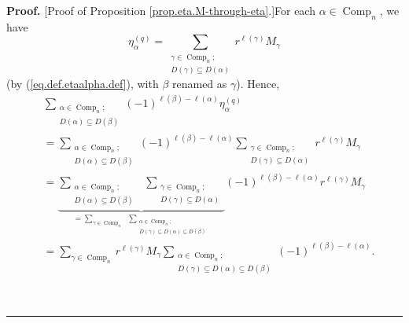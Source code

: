 \documentclass[numbers=enddot,12pt,final,onecolumn,notitlepage]{scrartcl}%
\theoremstyle{definition}
\newenvironment{proof}[1][Proof]{\noindent\textbf{#1.} }{\ \rule{0.5em}{0.5em}}
\let\sumnonlimits\sum
\renewcommand{\sum}{\sumnonlimits\limits}
\newenvironment{vershort}{}{}
\begin{document}
\begin{vershort}


\begin{proof}
[Proof of Proposition \ref{prop.eta.M-through-eta}.]For each $\alpha
\in\operatorname*{Comp}\nolimits_{n}$, we have%
\[
\eta_{\alpha}^{\left(  q\right)  }=\sum_{\substack{\gamma\in
\operatorname*{Comp}\nolimits_{n};\\D\left(  \gamma\right)  \subseteq D\left(
\alpha\right)  }}r^{\ell\left(  \gamma\right)  }M_{\gamma}%
\]
(by (\ref{eq.def.etaalpha.def}), with $\beta$ renamed as $\gamma$). Hence,%
\begin{align}
&  \sum_{\substack{\alpha\in\operatorname*{Comp}\nolimits_{n};\\D\left(
\alpha\right)  \subseteq D\left(  \beta\right)  }}\left(  -1\right)
^{\ell\left(  \beta\right)  -\ell\left(  \alpha\right)  }\eta_{\alpha
}^{\left(  q\right)  }\nonumber\\
&  =\sum_{\substack{\alpha\in\operatorname*{Comp}\nolimits_{n};\\D\left(
\alpha\right)  \subseteq D\left(  \beta\right)  }}\left(  -1\right)
^{\ell\left(  \beta\right)  -\ell\left(  \alpha\right)  }\sum
_{\substack{\gamma\in\operatorname*{Comp}\nolimits_{n};\\D\left(
\gamma\right)  \subseteq D\left(  \alpha\right)  }}r^{\ell\left(
\gamma\right)  }M_{\gamma}\nonumber\\
&  =\underbrace{\sum_{\substack{\alpha\in\operatorname*{Comp}\nolimits_{n}%
;\\D\left(  \alpha\right)  \subseteq D\left(  \beta\right)  }}\ \ \sum
_{\substack{\gamma\in\operatorname*{Comp}\nolimits_{n};\\D\left(
\gamma\right)  \subseteq D\left(  \alpha\right)  }}}_{=\sum_{\gamma
\in\operatorname*{Comp}\nolimits_{n}}\ \ \sum_{\substack{\alpha\in
\operatorname*{Comp}\nolimits_{n};\\D\left(  \gamma\right)  \subseteq D\left(
\alpha\right)  \subseteq D\left(  \beta\right)  }}}\left(  -1\right)
^{\ell\left(  \beta\right)  -\ell\left(  \alpha\right)  }r^{\ell\left(
\gamma\right)  }M_{\gamma}\nonumber\\
&  =\sum_{\gamma\in\operatorname*{Comp}\nolimits_{n}}r^{\ell\left(
\gamma\right)  }M_{\gamma}\sum_{\substack{\alpha\in\operatorname*{Comp}%
\nolimits_{n};\\D\left(  \gamma\right)  \subseteq D\left(  \alpha\right)
\subseteq D\left(  \beta\right)  }}\left(  -1\right)  ^{\ell\left(
\beta\right)  -\ell\left(  \alpha\right)  }.
\label{pf.prop.eta.M-through-eta.2}%
\end{align}



\end{proof}
\end{vershort}
\end{document}
